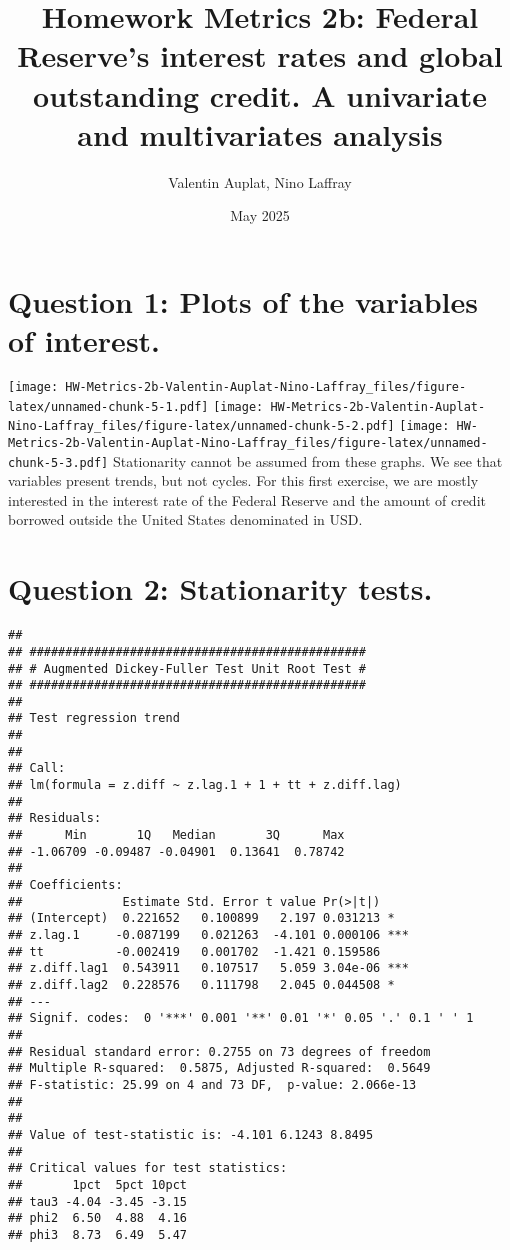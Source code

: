 \documentclass[
]{article}
\title{Homework Metrics 2b: Federal Reserve's interest rates and global
outstanding credit. A univariate and multivariates analysis}
\author{Valentin Auplat, Nino Laffray}
\date{May 2025}
\begin{document}
\maketitle

\hypertarget{question-1-plots-of-the-variables-of-interest.}{%
\section{Question 1: Plots of the variables of
interest.}\label{question-1-plots-of-the-variables-of-interest.}}

\texttt{[image: HW-Metrics-2b-Valentin-Auplat-Nino-Laffray\_files/figure-latex/unnamed-chunk-5-1.pdf]}
\texttt{[image: HW-Metrics-2b-Valentin-Auplat-Nino-Laffray\_files/figure-latex/unnamed-chunk-5-2.pdf]}
\texttt{[image: HW-Metrics-2b-Valentin-Auplat-Nino-Laffray\_files/figure-latex/unnamed-chunk-5-3.pdf]}
Stationarity cannot be assumed from these graphs. We see that variables
present trends, but not cycles. For this first exercise, we are mostly
interested in the interest rate of the Federal Reserve and the amount of
credit borrowed outside the United States denominated in USD.

\hypertarget{question-2-stationarity-tests.}{%
\section{Question 2: Stationarity
tests.}\label{question-2-stationarity-tests.}}

\begin{verbatim}
## 
## ############################################### 
## # Augmented Dickey-Fuller Test Unit Root Test # 
## ############################################### 
## 
## Test regression trend 
## 
## 
## Call:
## lm(formula = z.diff ~ z.lag.1 + 1 + tt + z.diff.lag)
## 
## Residuals:
##      Min       1Q   Median       3Q      Max 
## -1.06709 -0.09487 -0.04901  0.13641  0.78742 
## 
## Coefficients:
##              Estimate Std. Error t value Pr(>|t|)    
## (Intercept)  0.221652   0.100899   2.197 0.031213 *  
## z.lag.1     -0.087199   0.021263  -4.101 0.000106 ***
## tt          -0.002419   0.001702  -1.421 0.159586    
## z.diff.lag1  0.543911   0.107517   5.059 3.04e-06 ***
## z.diff.lag2  0.228576   0.111798   2.045 0.044508 *  
## ---
## Signif. codes:  0 '***' 0.001 '**' 0.01 '*' 0.05 '.' 0.1 ' ' 1
## 
## Residual standard error: 0.2755 on 73 degrees of freedom
## Multiple R-squared:  0.5875, Adjusted R-squared:  0.5649 
## F-statistic: 25.99 on 4 and 73 DF,  p-value: 2.066e-13
## 
## 
## Value of test-statistic is: -4.101 6.1243 8.8495 
## 
## Critical values for test statistics: 
##       1pct  5pct 10pct
## tau3 -4.04 -3.45 -3.15
## phi2  6.50  4.88  4.16
## phi3  8.73  6.49  5.47
\end{verbatim}
\end{document}
